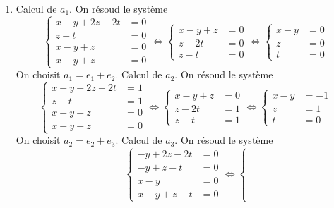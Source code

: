 \begin{enumerate}
\begin{enumerate}
 \item Calcul de $a_1$. On résoud le système
\begin{displaymath}
 \left\lbrace 
\begin{aligned}
 x-y+2z-2t&=0\\z-t &= 0\\ x-y+z &=0 \\  x-y+z &=0 
\end{aligned}
\right. 
\Leftrightarrow
 \left\lbrace 
\begin{aligned}
  x-y+z &=0 \\ z-2t&=0\\z-t &= 0 
\end{aligned}
\right.
\Leftrightarrow
 \left\lbrace 
\begin{aligned}
  x-y &=0 \\ z&=0\\t &= 0 
\end{aligned}
\right. 
\end{displaymath}
On choisit $a_1 = e_1+e_2$.\newline
Calcul de $a_2$. On résoud le système
\begin{displaymath}
 \left\lbrace 
\begin{aligned}
 x-y+2z-2t&=1\\z-t &= 1\\ x-y+z &=0 \\  x-y+z &=0 
\end{aligned}
\right. 
\Leftrightarrow
 \left\lbrace 
\begin{aligned}
  x-y+z &=0 \\ z-2t&=1\\z-t &= 1 
\end{aligned}
\right.
\Leftrightarrow
 \left\lbrace 
\begin{aligned}
  x-y &=-1 \\ z&=1\\t &= 0 
\end{aligned}
\right. 
\end{displaymath}
On choisit $a_2 = e_2 + e_3$.\newline
Calcul de $a_3$. On résoud le système
\begin{displaymath}
 \left\lbrace 
\begin{aligned}
 -y+2z-2t&=0\\-y+z-t &= 0\\ x-y &=0 \\  x-y+z-t &=0 
\end{aligned}
\right. 
\Leftrightarrow
 \left\lbrace 

\end{displaymath}
\end{enumerate}
\end{enumerate}
